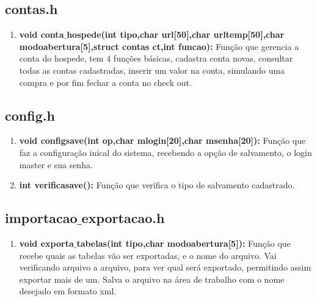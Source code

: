 \documentclass{article}
\begin{document}
\subsection{contas.h}
\begin{enumerate}
	\item \textbf{void conta$\_$hospede(int tipo,char url[50],char urltemp[50],char modoabertura[5],struct contas ct,int funcao): }Função que gerencia a conta do hospede, tem 4 funções básicas, cadastra conta novas, consultar todas as contas cadastradas, inserir um valor na conta, simulando uma compra e por fim fechar a conta no check out.\\
\end{enumerate}
\subsection{config.h}
\begin{enumerate}
	\item \textbf{void configsave(int op,char mlogin[20],char msenha[20]): }Função que faz a configuração inical do sistema, recebendo a opção de salvamento, o login master e sua senha.\\
	\item \textbf{int verificasave(): }Função que verifica o tipo de salvamento cadastrado.\\
\end{enumerate}
\subsection{importacao$\_$exportacao.h}
\begin{enumerate}
	\item \textbf{void exporta$\_$tabelas(int tipo,char modoabertura[5]): }Função que recebe quais as tabelas vão ser exportadas, e o nome do arquivo. Vai verificando arquivo a arquivo, para ver qual será exportado, permitindo assim exportar mais de um. Salva o arquivo na área de trabalho com o nome desejado em formato xml.\\
\end{enumerate}
\end{document}
